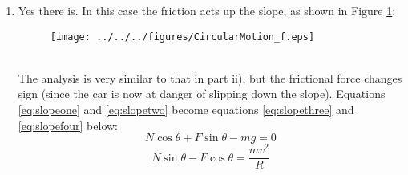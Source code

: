 \begin{problem}
{\begin{enumerate}
\begin{enumerate}
\begin{equation} \label{eq:slopeone} N\cos\theta-F\sin\theta-mg=0 \end{equation}
and
\begin{equation} \label{eq:slopetwo} N\sin\theta+F\cos\theta=\frac{mv^2}{R} \end{equation}
Substituting  in equation \eqref{eq:slopeone} gives
\begin{align*}
N\cos\theta-\mu N\sin\theta&=mg \\
\Rightarrow \frac{N\cos\theta-\mu N\sin\theta}{g}&=m
\end{align*}
then substituting in  and for  (using the expression above) in equation \eqref{eq:slopetwo} we find
\begin{equation*} N\sin\theta+\mu N\cos\theta=\frac{\left(N\cos\theta-\mu N\sin\theta\right)v^2}{gR} \end{equation*} 
\begin{equation*} \Rightarrow v^2=\frac{\sin\theta+\mu \cos\theta}{\cos\theta-\mu \sin\theta}\cdot gR \end{equation*}

Notice how in the case  this expression simplifies to the answer from part a), and similarly if  the answer from part b) i).
\\
\item Yes there is. In this case the friction acts up the slope, as shown in Figure \ref{fig:CircularMotion_f}:
\begin{figure}[ht]
\centering
\texttt{[image: ../../../figures/CircularMotion\_f.eps]}
\caption{}
\label{fig:CircularMotion_f}
\end{figure}
\\
The analysis is very similar to that in part ii), but the frictional force changes sign (since the car is now at danger of slipping down the slope). Equations \eqref{eq:slopeone} and \eqref{eq:slopetwo} become equations \eqref{eq:slopethree} and \eqref{eq:slopefour} below:
\begin{equation}
 N\cos\theta+F\sin\theta-mg=0
\label{eq:slopethree}
\end{equation}
\begin{equation} 
N\sin\theta-F\cos\theta=\frac{mv^2}{R}
\label{eq:slopefour}
\end{equation}


\end{enumerate}
\end{enumerate}}
\end{problem}
